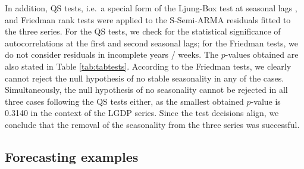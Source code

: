 \begin{table}
\centering
\caption{\label{tab:tabtests}Selected bandwidths for the three series LGDP, NLF and LCO, estimated ARMA parameters and corresponding standard errors for DeSeaTS residuals and $p$-values for QS tests and Friedman tests applied to S-Semi-ARMA residuals.}
\centering
{}
\end{table}

In addition, QS tests, i.e.~a special form of the Ljung-Box test at seasonal lags \citep{ljung1978measure}, and Friedman rank tests \citep{friedman1937ranks, friedman1939correction} were applied to the S-Semi-ARMA residuals fitted to the three series. For the QS tests, we check for the statistical significance of autocorrelations at the first and second seasonal lags; for the Friedman tests, we do not consider residuals in incomplete years / weeks. The \(p\)-values obtained are also stated in Table \ref{tab:tabtests}. According to the Friedman tests, we clearly cannot reject the null hypothesis of no stable seasonality in any of the cases. Simultaneously, the null hypothesis of no seasonality cannot be rejected in all three cases following the QS tests either, as the smallest obtained \(p\)-value is 0.3140 in the context of the LGDP series. Since the test decisions align, we conclude that the removal of the seasonality from the three series was successful.

\subsection{Forecasting examples}\label{forecasting-examples}

